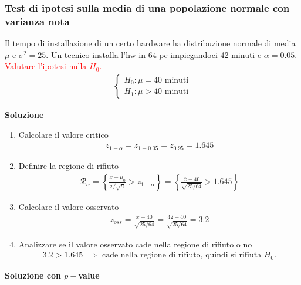 \documentclass{article}  %
\theoremstyle{definition}
\begin{document}
\subsubsection{Test di ipotesi sulla media di una popolazione normale con varianza nota}
\begin{esercizio}
	Il tempo di installazione di un certo hardware ha distribuzione normale di media $\mu$ e $\sigma^2=25$. Un tecnico installa l'hw in 64 pc impiegandoci 42 minuti e $\alpha=0.05$.
	\textcolor{red}{Valutare
		l'ipotesi nulla $H_0$.}
	\begin{align*}
		\begin{cases}
			H_0: \mu = 40 \text{ minuti} \\
			H_1: \mu > 40 \text{ minuti}
		\end{cases}
	\end{align*}
	\begin{center}
		\textbf{Soluzione}
	\end{center}
	\begin{enumerate}
		\item Calcolare il valore critico
		      \begin{align*}
			      z_{1-\alpha}=z_{1-0.05}=z_{0.95}=1.645
		      \end{align*}
		\item Definire la regione di rifiuto
		      \begin{align*}
			      \mathcal{R}_{\alpha}=\left\{\frac{\overline{x}-\mu_0}{\sigma/\sqrt{n}} > z_{1-\alpha} \right\} = \left\{\frac{\overline{x}-40}{\sqrt{25/64}} > 1.645\right\}
		      \end{align*}
		\item Calcolare il valore osservato
		      \begin{align*}
			      z_{oss} = \frac{\overline{x}-40}{\sqrt{25/64}} = \frac{42-40}{\sqrt{25/64}} = 3.2
		      \end{align*}
		\item Analizzare se il valore osservato cade nella regione di rifiuto o no
		      \begin{align*}
			      3.2 > 1.645 \implies \text{ cade nella regione di rifiuto, quindi si rifiuta } H_0.
		      \end{align*}
	\end{enumerate}
	\begin{center}
		\textbf{Soluzione con $p-$value}
	\end{center}
	\begin{enumerate}

\end{enumerate}
\end{esercizio}
\end{document}
